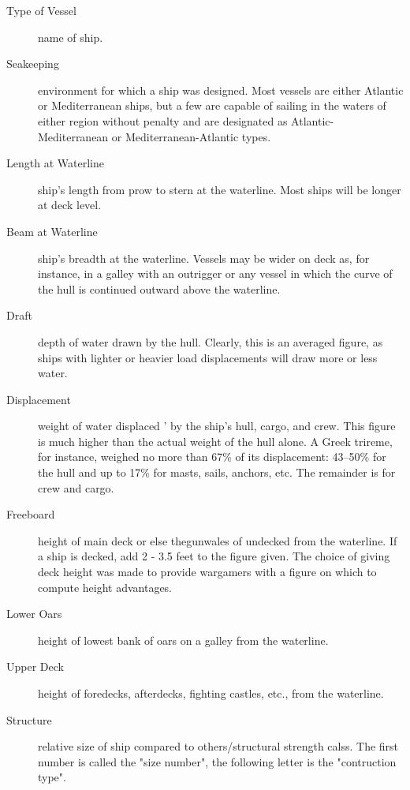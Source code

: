 \documentclass{article}
\begin{document}
\begin{description}
\item[Type of Vessel] name of ship.

\item[Seakeeping] environment for which a ship was designed.  Most
  vessels are either Atlantic or Mediterranean ships, but a few are
  capable of sailing in the waters of either region without penalty
  and are designated as Atlantic-Mediterranean or
  Mediterranean-Atlantic types.

\item[Length at Waterline] ship's length from prow to stern at the
  waterline.  Most ships will be longer at deck level.

\item[Beam at Waterline] ship's breadth at the waterline.  Vessels may
  be wider on deck as, for instance, in a galley with an outrigger or
  any vessel in which the curve of the hull is continued outward above
  the waterline.

\item[Draft] depth of water drawn by the hull. Clearly, this is an
  averaged figure, as ships with lighter or heavier load displacements
  will draw more or less water.



\item[Displacement] weight of water displaced ' by the ship's hull,
  cargo, and crew.  This figure is much higher than the actual weight
  of the hull alone.  A Greek trireme, for instance, weighed no more
  than 67\% of its displacement: 43--50\% for the hull and up to 17\%
  for masts, sails, anchors, etc.  The remainder is for crew and
  cargo.

\item[Freeboard] height of main deck or else thegunwales of undecked from
  the waterline. If a ship is decked, add 2 - 3.5 feet to the figure
  given.  The choice of giving deck height was made to provide
  wargamers with a figure on which to compute height advantages.

\item[Lower Oars] height of lowest bank of oars on a galley from the
  waterline.

\item[Upper Deck] height of foredecks, afterdecks, fighting castles,
  etc., from the waterline.

\item[Structure] relative size of ship compared to others/structural
  strength calss.  The first number is called the "size number", the
  following letter is the "contruction type".


\end{description}
\end{document}
